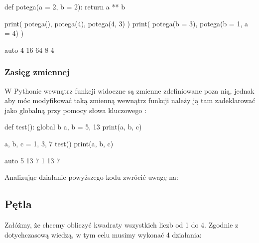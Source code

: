 \begin{CodeFrame}[python]{.65\textwidth}
def potega(a = 2, b = 2):
    return a ** b

print( potega(), potega(4), potega(4, 3) )
print( potega(b = 3), potega(b = 1, a = 4) )
\end{CodeFrame}
\begin{CodeFrame}{auto}
4 16 64
8 4
\end{CodeFrame}

\subsubsection{Zasięg zmiennej }

W Pythonie wewnątrz funkcji widoczne są zmienne zdefiniowane poza nią, jednak aby móc modyfikować taką zmienną wewnątrz
funkcji należy ją tam zadeklarować jako globalną przy pomocy słowa kluczowego :

\begin{CodeFrame}[python]{.5\textwidth}
def test():
  global b
  a, b = 5, 13
  print(a, b, c)

a, b, c = 1, 3, 7
test()
print(a, b, c)
\end{CodeFrame}
\begin{CodeFrame}{auto}
5 13 7
1 13 7
\end{CodeFrame}

\noindent
Analizując działanie powyższego kodu zwrócić uwagę na:


\subsection{Pętla }
Załóżmy, że chcemy obliczyć kwadraty wszystkich liczb od 1 do 4.
Zgodnie z dotychczasową wiedzą, w tym celu musimy wykonać 4 działania:

